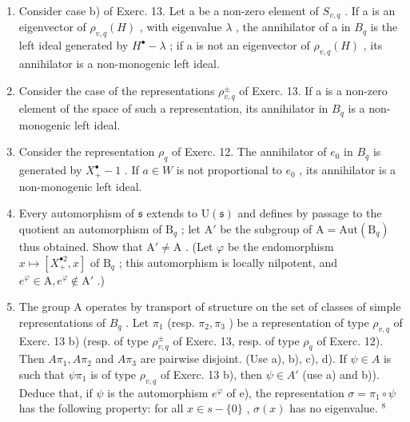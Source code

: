 \begin{enumerate}
\def\labelenumi{\alph{enumi})}
\setcounter{enumi}{1}
\item
  Consider case b) of Exerc. 13. Let a be a non-zero element of \(S_{v,q}\) . If a is an eigenvector of \(\rho_{v,q}(H)\) , with eigenvalue \(\lambda\) , the annihilator of a in \(B_{q}\) is the left ideal generated by \(H^{\bullet}-\lambda\) ; if a is not an eigenvector of \(\rho_{v,q}(H)\) , its annihilator is a non-monogenic left ideal.
\item
  Consider the case of the representations \(\rho_{v,q}^{\pm}\) of Exerc. 13. If a is a non-zero element of the space of such a representation, its annihilator in \(B_{q}\) is a non-monogenic left ideal.
\item
  Consider the representation \(\rho_{q}\) of Exerc. 12. The annihilator of \(e_{0}\) in \(B_{q}\) is generated by \(X_{+}^{\bullet}-1\) . If \(a\in W\) is not proportional to \(e_{0}\) , its annihilator is a non-monogenic left ideal.
\item
  Every automorphism of \(\mathfrak{s}\) extends to \(\mathrm{U}(\mathfrak{s})\) and defines by passage to the quotient an automorphism of \(\mathrm{B}_q\) ; let \(\mathrm{A}'\) be the subgroup of \(\mathrm{A} = \mathrm{Aut}(\mathrm{B}_q)\) thus obtained. Show that \(\mathrm{A}' \neq \mathrm{A}\) . (Let \(\varphi\) be the endomorphism \(x \mapsto [X_{+}^{\bullet 2}, x]\) of \(\mathrm{B}_q\) ; this automorphism is locally nilpotent, and \(e^{\varphi} \in \mathrm{A}, e^{\varphi} \notin \mathrm{A}'\) .)
\item
  The group A operates by transport of structure on the set of classes of simple representations of \(B_{q}\) . Let \(\pi_{1}\) (resp. \(\pi_{2},\pi_{3}\) ) be a representation of type \(\rho_{v,q}\) of Exerc. 13 b) (resp. of type \(\rho_{v,q}^{\pm}\) of Exerc. 13, resp. of type \(\rho_{q}\) of Exerc. 12). Then \(A\pi_{1},A\pi_{2}\) and \(A\pi_{3}\) are pairwise disjoint. (Use a), b), c), d). If \(\psi\in A\) is such that \(\psi\pi_{1}\) is of type \(\rho_{v,q}\) of Exerc. 13 b), then \(\psi\in A'\) (use a) and b)). Deduce that, if \(\psi\) is the automorphism \(e^{\varphi}\) of e), the representation \(\sigma=\pi_{1}\circ\psi\) has the following property: for all \(x\in s-\{0\}\) , \(\sigma(x)\) has no eigenvalue. \(^{8}\)
\end{enumerate}


